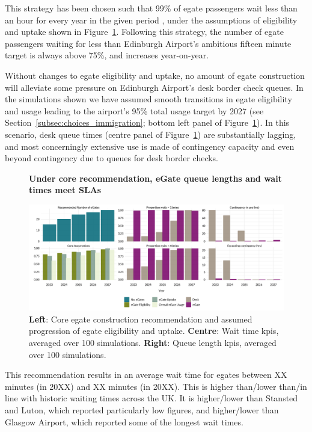 \documentclass[10pt]{article}
\newcommand*{\figuretitle}[1]{%
    {\centering%
    \textbf{#1}%
    \par\medskip}%
}
\begin{document}
This strategy has been chosen such that 99\% of \gls{egate} passengers wait less than an hour for every year in the given period , under the assumptions of eligibility and uptake shown in Figure~\ref{fig:core_rec_fig}. Following this strategy, the number of \gls{egate} passengers waiting for less than Edinburgh Airport's ambitious fifteen minute target is always above 75\%, and increases year-on-year. 

Without changes to \gls{egate} eligibility and uptake, no amount of \gls{egate} construction will alleviate some pressure on Edinburgh Airport's desk border check queues. In the simulations shown we have assumed smooth transitions in \gls{egate} eligibility and usage leading to the airport's 95\% total usage target by 2027 (see Section~\ref{subsec:choices_immigration}; bottom left panel of Figure~\ref{fig:core_rec_fig}). In this scenario, desk queue times (centre panel of Figure~\ref{fig:core_rec_fig}) are substantially lagging, and most concerningly extensive use is made of contingency capacity and even beyond contingency due to queues for desk border checks. 


\begin{figure}[!ht]
    \centering
    \figuretitle{Under core recommendation, eGate queue lengths and wait times meet SLAs}
    \includegraphics[width=\textwidth]{figures/core_rec_fig.png}
     \caption{\textbf{Left}: Core \gls{egate} construction recommendation and assumed progression of \gls{egate} eligibility and uptake. \textbf{Centre}: Wait time \glspl{kpi}, averaged over 100 simulations. \textbf{Right}: Queue length \glspl{kpi}, averaged over 100 simulations.} \label{fig:core_rec_fig}
\end{figure}

This recommendation results in an average wait time for \glspl{egate} between XX minutes (in 20XX) and XX minutes (in 20XX). This is higher than/lower than/in line with historic waiting times across the UK. It is higher/lower than Stansted and Luton, which reported particularly low figures, and higher/lower than Glasgow Airport, which reported some of the longest wait times. 
\end{document}
